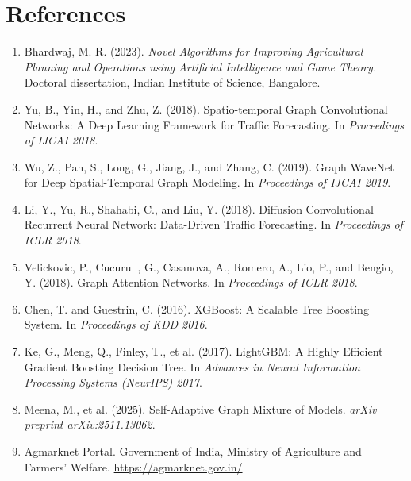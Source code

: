 \documentclass[12pt,a4paper]{article}
\begin{document}
\section{References}

\begin{enumerate}
\item Bhardwaj, M. R. (2023). \textit{Novel Algorithms for Improving Agricultural Planning and Operations using Artificial Intelligence and Game Theory.} Doctoral dissertation, Indian Institute of Science, Bangalore.

\item Yu, B., Yin, H., and Zhu, Z. (2018). Spatio-temporal Graph Convolutional Networks: A Deep Learning Framework for Traffic Forecasting. In \textit{Proceedings of IJCAI 2018}.

\item Wu, Z., Pan, S., Long, G., Jiang, J., and Zhang, C. (2019). Graph WaveNet for Deep Spatial-Temporal Graph Modeling. In \textit{Proceedings of IJCAI 2019}.

\item Li, Y., Yu, R., Shahabi, C., and Liu, Y. (2018). Diffusion Convolutional Recurrent Neural Network: Data-Driven Traffic Forecasting. In \textit{Proceedings of ICLR 2018}.

\item Velickovic, P., Cucurull, G., Casanova, A., Romero, A., Lio, P., and Bengio, Y. (2018). Graph Attention Networks. In \textit{Proceedings of ICLR 2018}.

\item Chen, T. and Guestrin, C. (2016). XGBoost: A Scalable Tree Boosting System. In \textit{Proceedings of KDD 2016}.

\item Ke, G., Meng, Q., Finley, T., et al. (2017). LightGBM: A Highly Efficient Gradient Boosting Decision Tree. In \textit{Advances in Neural Information Processing Systems (NeurIPS) 2017}.

\item Meena, M., et al. (2025). Self-Adaptive Graph Mixture of Models. \textit{arXiv preprint arXiv:2511.13062}.

\item Agmarknet Portal. Government of India, Ministry of Agriculture and Farmers' Welfare. \url{https://agmarknet.gov.in/}
\end{enumerate}
\end{document}
